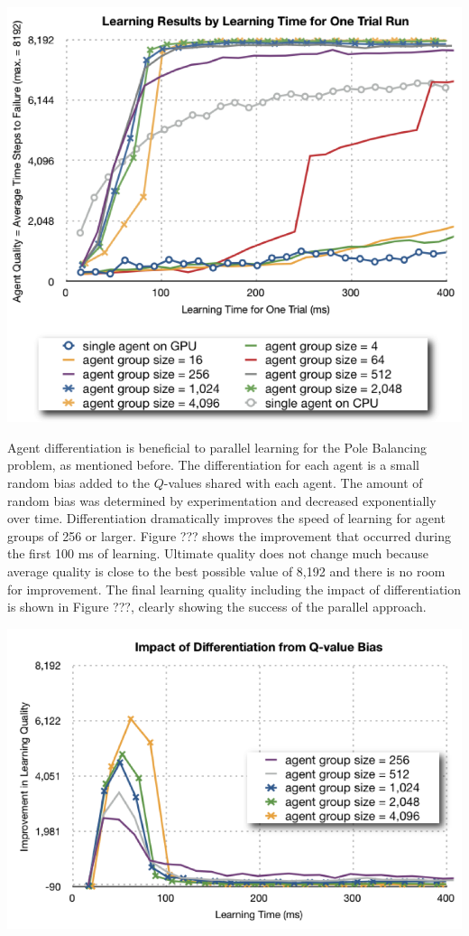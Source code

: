 \documentclass[11pt]{article} %
\begin{document}
\includegraphics[scale=0.8]{fig08}
\begin{flushleft}


Agent differentiation is beneficial to parallel learning for the Pole Balancing problem, as mentioned before.  The differentiation for each agent is a small random bias added to the $Q$-values shared with each agent. The amount of random bias was determined by experimentation and decreased exponentially over time.  Differentiation dramatically improves the speed of learning for agent groups of 256 or larger.  Figure ??? shows the improvement that occurred during the first 100 ms of learning.  Ultimate quality does not change much because average quality is close to the best possible value of 8,192 and there is no room for improvement.  The final learning quality including the impact of differentiation is shown in Figure ???, clearly showing the success of the parallel approach.

\end{flushleft}
\center
\includegraphics[scale=0.8]{fig09}
\end{document}
